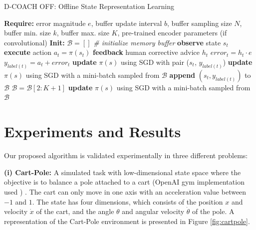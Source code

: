 \begin{algorithm}[h]
\caption{D-COACH OFF: Offline State Representation Learning}\label{algorithm:DeepCOACH}
\begin{algorithmic}[1]
\State \textbf{Require:} error magnitude $e$, buffer update interval $b$, buffer sampling size $N$, buffer min. size $k$, buffer max. size $K$, pre-trained encoder parameters (if convolutional) 
\State \textbf{Init:} $\mathcal{B} = []$  \emph{\# initialize memory buffer}
\State \textbf{observe} state $s_{t}$
\State \textbf{execute} action $a_{t}=\pi(s_{t})$
\State \textbf{feedback} human corrective advice $h_{t}$
\State $\mathit{error}_{t} = h_{t}\cdot e$
\State $y_{label(t)} = a_{t} + \mathit{error}_{t}$ 
\State \textbf{update} $\pi(s)$ using SGD with pair ($s_{t}$, $y_{\mathit{label}(t)}$) 
\State \textbf{update} $\pi(s)$ using SGD with a mini-batch sampled from $\mathcal{B}$
\State \textbf{append} $(s_{t}, y_{\mathit{label}(t)})$ to $\mathcal{B}$
\State $\mathcal{B} = \mathcal{B}[2:K+1]$
\EndIf
\EndIf
{}
\State \textbf{update} $\pi(s)$ using SGD with a mini-batch sampled from $\mathcal{B}$
\EndIf
\EndFor
\end{algorithmic}
\end{algorithm}

\vspace{-0.1cm}
\section{Experiments and Results}
\vspace{-0.1cm}

Our proposed algorithm is validated experimentally in three different problems: 

\textbf{(i) Cart-Pole:} A simulated task with low-dimensional state space where the objective is to balance a pole attached to a cart (OpenAI gym implementation used \cite{brockman2016openai}) . The cart can only move in one axis with an acceleration value between $-1$ and $1$. The state has four dimensions, which consists of the position $x$ and velocity $\dot x$ of the cart, and the angle $\theta$ and angular velocity $\dot \theta$ of the pole. A representation of the Cart-Pole environment is presented in Figure \ref{fig:cartpole}.

